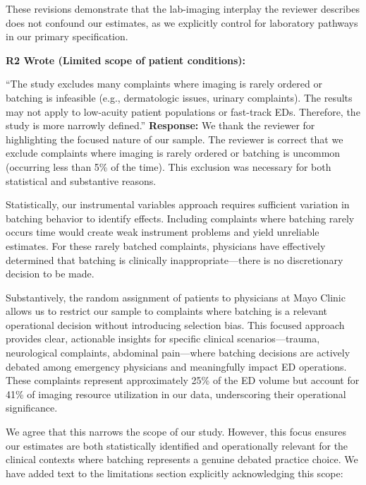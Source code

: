 \documentclass[11pt]{article}
\newenvironment{quote2}
{ \bigskip
\noindent
         \small\em
         \baselineskip=14pt
}
\newcommand{\1}{\hbox{\rm 1\kern-.35em 1}}
\begin{document}
These revisions demonstrate that the lab-imaging interplay the reviewer describes does not confound our estimates, as we explicitly control for laboratory pathways in our primary specification.
\color{black}



\begin{quote2}
\textbf{R2 Wrote (Limited scope of patient conditions):}  
 
\noindent``The study excludes many complaints where imaging is rarely ordered or batching is infeasible (e.g., dermatologic issues, urinary complaints). The results may not apply to low-acuity patient populations or fast-track EDs. Therefore, the study is more narrowly defined.” 
\end{quote2}

\noindent\textbf{Response:} \color{blue}We thank the reviewer for highlighting the focused nature of our sample. The reviewer is correct that we exclude complaints where imaging is rarely ordered or batching is uncommon (occurring less than 5\% of the time). This exclusion was necessary for both statistical and substantive reasons.

Statistically, our instrumental variables approach requires sufficient variation in batching behavior to identify effects. Including complaints where batching rarely occurs time would create weak instrument problems and yield unreliable estimates. For these rarely batched complaints, physicians have effectively determined that batching is clinically inappropriate—there is no discretionary decision to be made.

Substantively, the random assignment of patients to physicians at Mayo Clinic allows us to restrict our sample to complaints where batching is a relevant operational decision without introducing selection bias. This focused approach provides clear, actionable insights for specific clinical scenarios—trauma, neurological complaints, abdominal pain—where batching decisions are actively debated among emergency physicians and meaningfully impact ED operations. These complaints represent approximately 25\% of the ED volume but account for 41\% of imaging resource utilization in our data, underscoring their operational significance.

We agree that this narrows the scope of our study. However, this focus ensures our estimates are both statistically identified and operationally relevant for the clinical contexts where batching represents a genuine debated practice choice. We have added text to the limitations section explicitly acknowledging this scope:
\end{document}

